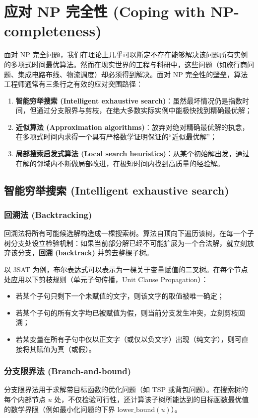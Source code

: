 \chapter{应对 NP 完全性 (Coping with NP-completeness)}

面对 NP 完全问题，我们在理论上几乎可以断定不存在能够解决该问题所有实例的多项式时间最优算法。然而在现实世界的工程与科研中，这些问题（如旅行商问题、集成电路布线、物流调度）却必须得到解决。面对 NP 完全性的壁垒，算法工程师通常有三条行之有效的应对突围路径：
\begin{enumerate}
    \item \textbf{智能穷举搜索 (Intelligent exhaustive search)}：虽然最坏情况仍是指数时间，但通过分支限界与剪枝，在绝大多数实际实例中能极快找到精确最优解；
    \item \textbf{近似算法 (Approximation algorithms)}：放弃对绝对精确最优解的执念，在多项式时间内求得一个具有严格数学证明保证的“近似最优解”；
    \item \textbf{局部搜索启发式算法 (Local search heuristics)}：从某个初始解出发，通过在解的邻域内不断做局部改进，在极短时间内找到高质量的经验解。
\end{enumerate}

\section{智能穷举搜索 (Intelligent exhaustive search)}

\subsection{回溯法 (Backtracking)}
回溯法将所有可能候选解构造成一棵搜索树。算法自顶向下遍历该树，在每一个子树分支处设立检验机制：如果当前部分解已经不可能扩展为一个合法解，就立刻放弃该分支，\textbf{回溯 (backtrack)} 并剪去整棵子树。

以 3SAT 为例，布尔表达式可以表示为一棵关于变量赋值的二叉树。在每个节点处应用以下剪枝规则（单元子句传播，Unit Clause Propagation）：
\begin{itemize}
    \item 若某个子句只剩下一个未赋值的文字，则该文字的取值被唯一确定；
    \item 若某个子句的所有文字均已被赋值为假，则当前分支发生冲突，立刻剪枝回溯；
    \item 若某变量在所有子句中仅以正文字（或仅以负文字）出现（纯文字），则可直接将其赋值为真（或假）。
\end{itemize}

\subsection{分支限界法 (Branch-and-bound)}
分支限界法用于求解带目标函数的优化问题（如 TSP 或背包问题）。在搜索树的每个内部节点 $u$ 处，不仅检验可行性，还计算该子树所能达到的目标函数最优值的数学界限（例如最小化问题的下界 $\text{lower\_bound}(u)$）。

